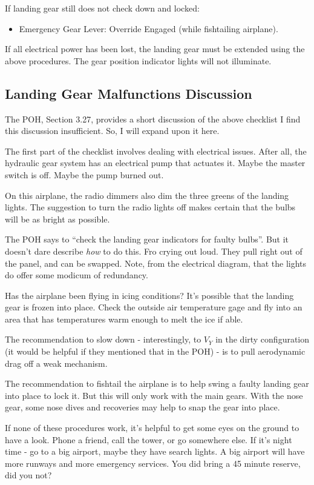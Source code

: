 If landing gear still does not check down and locked:
\begin{itemize}
\item Emergency Gear Lever: Override Engaged (while fishtailing airplane).
\end{itemize}

If all electrical power has been lost, the landing gear must be extended using the above procedures. The gear position indicator lights will not illuminate.

\subsection{Landing Gear Malfunctions Discussion}

The POH, Section 3.27, provides a short discussion of the above checklist I find this discussion insufficient. So, I will expand upon it here.

The first part of the checklist involves dealing with electrical issues. After all, the hydraulic gear system has an electrical pump that actuates it. Maybe the master switch is off. Maybe the pump burned out.

On this airplane, the radio dimmers also dim the three greens of the landing lights. The suggestion to turn the radio lights off makes certain that the bulbs will be as bright as possible.

The POH says to ``check the landing gear indicators for faulty bulbs''. But it doesn't dare describe \emph{how} to do this. Fro crying out loud. They pull right out of the panel, and can be swapped. Note, from the electrical diagram, that the lights do offer some modicum of redundancy.

Has the airplane been flying in icing conditions? It's possible that the landing gear is frozen into place. Check the outside air temperature gage and fly into an area that has temperatures warm enough to melt the ice if able.

The recommendation to slow down - interestingly, to $V_Y$ in the dirty configuration (it would be helpful if they mentioned that in the POH) - is to pull aerodynamic drag off a weak mechanism.

The recommendation to fishtail the airplane is to help swing a faulty landing gear into place to lock it. But this will only work with the main gears. With the nose gear, some nose dives and recoveries may help to snap the gear into place.

If none of these procedures work, it's helpful to get some eyes on the ground to have a look. Phone a friend, call the tower, or go somewhere else. If it's night time - go to a big airport, maybe they have search lights. A big airport will have more runways and more emergency services. You did bring a 45 minute reserve, did you not?

